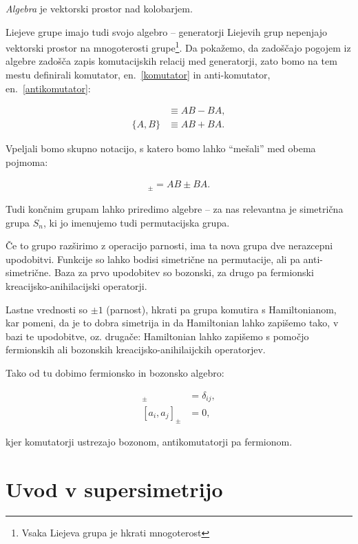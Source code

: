 \emph{Algebra} je vektorski prostor nad kolobarjem.

Liejeve grupe imajo tudi svojo algebro -- generatorji Liejevih grup nepenjajo vektorski
prostor na mnogoterosti grupe\footnote{Vsaka Liejeva grupa je hkrati mnogoterost}. Da poka\v zemo,
da zado\v s\v cajo pogojem iz algebre zado\v s\v ca zapis komutacijskih relacij med generatorji, zato
bomo na tem mestu definirali komutator, en.~\eqref{komutator} in anti-komutator, en.~\eqref{antikomutator}:

\begin{align}
	[A,B] &\equiv AB - BA, \label{komutator}\\
	\{A,B\} &\equiv AB + BA. \label{antikomutator}
\end{align}

Vpeljali bomo skupno notacijo, s katero bomo lahko "`me\v sali"' med obema pojmoma:

\begin{align}
	[A,B]_\pm = AB \pm BA.
\end{align}

Tudi kon\v cnim grupam lahko priredimo algebre -- za nas relevantna je simetri\v cna grupa
$S_n$, ki jo imenujemo tudi permutacijska grupa.

\v Ce to grupo raz\v sirimo z operacijo parnosti, ima ta nova grupa dve nerazcepni upodobitvi. Funkcije so lahko
bodisi simetri\v cne na permutacije, ali pa anti-simetri\v cne. Baza za prvo upodobitev so bozonski, za drugo
pa fermionski kreacijsko-anihilacijski operatorji.

Lastne vrednosti so $\pm 1$ (parnost), hkrati pa grupa komutira s Hamiltonianom, kar pomeni,
da je to dobra simetrija in da Hamiltonian lahko zapi\v semo tako, v bazi te upodobitve, oz. druga\v ce:
Hamiltonian lahko zapi\v semo s pomo\v cjo fermionskih ali bozonskih kreacijsko-anihilaijckih operatorjev.

Tako od tu dobimo fermionsko in bozonsko algebro:

\begin{align}
	[a_i, a_j^\dagger]_\pm &= \delta_{ij}, \\
	[a_i, a_j]_\pm &= 0,
\end{align}

kjer komutatorji ustrezajo bozonom, antikomutatorji pa fermionom.

\section{Uvod v supersimetrijo}

